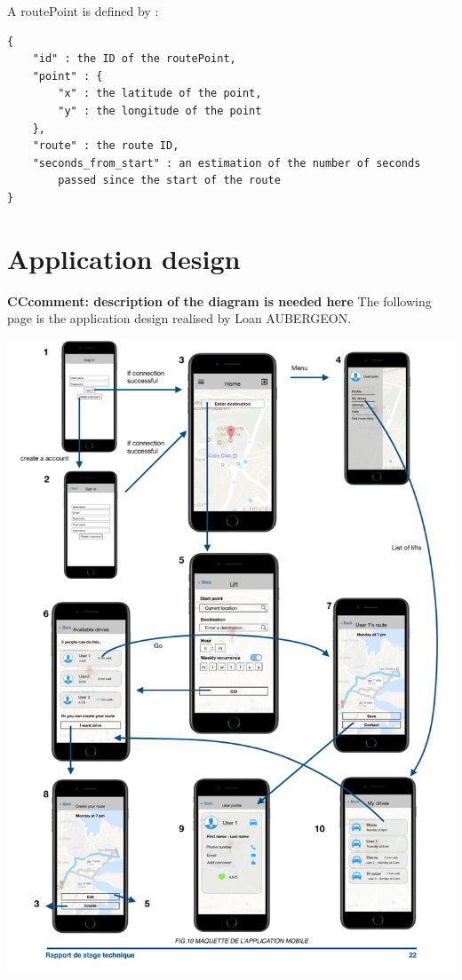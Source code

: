 A routePoint is defined by :
\begin{lstlisting}[style=DOS]
{
	"id" : the ID of the routePoint,
	"point" : {
		"x" : the latitude of the point,
		"y" : the longitude of the point
	},
	"route" : the route ID,
	"seconds_from_start" : an estimation of the number of seconds
		passed since the start of the route
}
\end{lstlisting}


\section{Application design}

{\bf CCcomment: description of the diagram is needed here}
The following page is the application design realised by Loan AUBERGEON.
\newpage
\begin{changemargin}{-2.5cm}{-2.5cm}{-3.8cm}
\includegraphics[page=1]{maquettes} 
\end{changemargin}